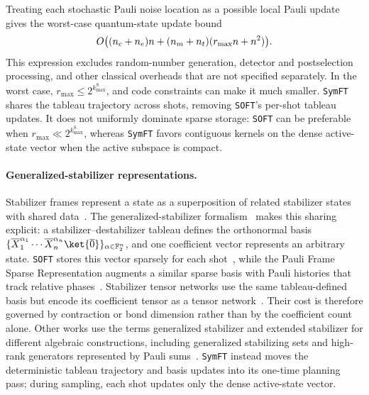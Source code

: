 \documentclass[a4paper,onecolumn,unpublished]{quantumarticle}
\DeclarePairedDelimiter\rbra{\lparen}{\rparen}
\newcommand{\tFont}[1]{\texttt{#1}}
\newcommand{\symft}{\tFont{SymFT}}
\newcommand{\soft}{\tFont{SOFT}}
\newcommand{\FF}{\mathbb{F}}
\begin{document}
\begin{itemize}
    Treating each stochastic Pauli noise location as a possible local Pauli update gives the worst-case quantum-state update bound
    \begin{equation*}
        O\rbra*{(n_c+n_e)n+(n_m+n_t)(r_{\max}n+n^2)}.
    \end{equation*}
    This expression excludes random-number generation, detector and postselection processing, and other classical overheads that are not specified separately.
    In the worst case, \(r_{\max}\leq 2^{k_{\max}^{\mathrm S}}\), and code constraints can make it much smaller.
    \symft{} shares the tableau trajectory across shots, removing \soft{}'s per-shot tableau updates.
    It does not uniformly dominate sparse storage: \soft{} can be preferable when \(r_{\max}\ll 2^{k_{\max}^{\mathrm S}}\), whereas \symft{} favors contiguous kernels on the dense active-state vector when the active subspace is compact.
\end{itemize}

\paragraph{Generalized-stabilizer representations.}
Stabilizer frames represent a state as a superposition of related stabilizer states with shared data~\cite{GMC13,GM15}.
The generalized-stabilizer formalism~\cite{Yoder12} makes this sharing explicit: a stabilizer--destabilizer tableau defines the orthonormal basis $\{\overline{X}_1^{\alpha_1}\cdots\overline{X}_n^{\alpha_n}\ket{\overline{0}}\}_{\alpha\in\FF_2^n}$, and one coefficient vector represents an arbitrary state.
\soft{} stores this vector sparsely for each shot~\cite{LZZ+25}, while the Pauli Frame Sparse Representation augments a similar sparse basis with Pauli histories that track relative phases~\cite{TA26}.
Stabilizer tensor networks use the same tableau-defined basis but encode its coefficient tensor as a tensor network~\cite{MG24,NHW25,CRG+26}.
Their cost is therefore governed by contraction or bond dimension rather than by the coefficient count alone.
Other works use the terms generalized stabilizer and extended stabilizer for different algebraic constructions, including generalized stabilizing sets and high-rank generators represented by Pauli sums~\cite{DD24,HDD+26}.
\symft{} instead moves the deterministic tableau trajectory and basis updates into its one-time planning pass; during sampling, each shot updates only the dense active-state vector.
\end{document}
